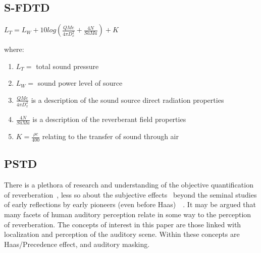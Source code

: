 \documentclass{svproc}
\begin{document}

\subsection{S-FDTD}

\begin{center}
$L_T = L_W + 10 log \left( \frac{QMe}{4\pi D_{x}^2} + \frac{4N}{S \overline{a} M a}\right) + K $\\
\end{center}
where:
\begin{enumerate}
\item $L_T =$ total sound pressure
\item $L_W =$ sound power level of source
\item $\frac{QMe}{4\pi D_{x}^2}$ is a description of the sound source direct radiation properties
\item $\frac{4N}{S \overline{a} M a}$ is a description of the reverberant field properties
\item $K = \frac{\rho \textit{c}}{400}$ relating to the transfer of sound through air
\end{enumerate}


\subsection{PSTD}
There is a plethora of research and understanding of the objective quantification of reverberation~\cite{rossing2007springer}, less so about the subjective effects~\cite{Karjalainen2001} beyond the seminal studies of early reflections by early pioneers (even before Haas)~\cite{Haas1972}~\cite{Begault1995}. 
It may be argued that many facets of human auditory perception relate in some way to the perception of reverberation. The concepts of interest in this paper are those linked with localization and perception of the auditory scene. Within these concepts are Haas/Precedence effect, and auditory masking.
\end{document}
